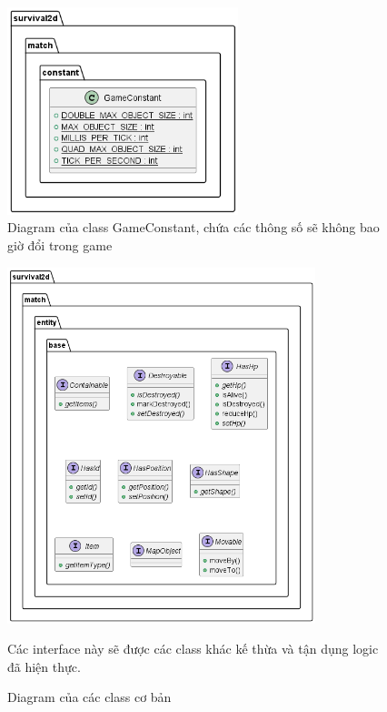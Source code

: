 \documentclass[12pt,a4paper]{article}
\begin{document}
  \begin{figure}[H]
    \centering
    \includegraphics[width=0.6\textwidth]{Img/uml/constant.png}
    \caption{Diagram của class GameConstant, chứa các thông số sẽ không bao giờ đổi trong game}
  \end{figure}

  \begin{figure}[H]
    \centering
    \includegraphics[width=0.8\textwidth]{Img/uml/base.png}
    \caption{Diagram của các class cơ bản}
    Các interface này sẽ được các class khác kế thừa và tận dụng logic đã hiện thực.
  \end{figure}
\end{document}
